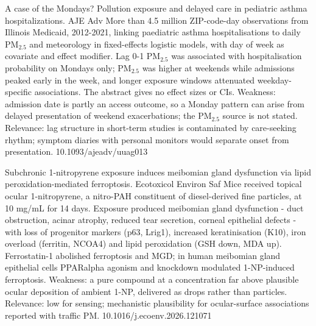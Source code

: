 \documentclass[10pt]{article}
\begin{document}
{A case of the Mondays? Pollution exposure and delayed care in pediatric asthma hospitalizations.}
{AJE Adv}
{More than 4.5 million ZIP-code-day observations from Illinois Medicaid, 2012-2021, linking paediatric asthma hospitalisations to daily PM$_{2.5}$ and meteorology in fixed-effects logistic models, with day of week as covariate and effect modifier. Lag 0-1 PM$_{2.5}$ was associated with hospitalisation probability on Mondays only; PM$_{2.5}$ was higher at weekends while admissions peaked early in the week, and longer exposure windows attenuated weekday-specific associations. The abstract gives no effect sizes or CIs. Weakness: admission date is partly an access outcome, so a Monday pattern can arise from delayed presentation of weekend exacerbations; the PM$_{2.5}$ source is not stated. Relevance: lag structure in short-term studies is contaminated by care-seeking rhythm; symptom diaries with personal monitors would separate onset from presentation.}
{10.1093/ajeadv/uuag013}

\par{}\baselineskip{}\baselineskip
{}

{Subchronic 1-nitropyrene exposure induces meibomian gland dysfunction via lipid peroxidation-mediated ferroptosis.}
{Ecotoxicol Environ Saf}
{Mice received topical ocular 1-nitropyrene, a nitro-PAH constituent of diesel-derived fine particles, at 10 mg/mL for 14 days. Exposure produced meibomian gland dysfunction - duct obstruction, acinar atrophy, reduced tear secretion, corneal epithelial defects - with loss of progenitor markers (p63, Lrig1), increased keratinisation (K10), iron overload (ferritin, NCOA4) and lipid peroxidation (GSH down, MDA up). Ferrostatin-1 abolished ferroptosis and MGD; in human meibomian gland epithelial cells PPARalpha agonism and knockdown modulated 1-NP-induced ferroptosis. Weakness: a pure compound at a concentration far above plausible ocular deposition of ambient 1-NP, delivered as drops rather than particles. Relevance: low for sensing; mechanistic plausibility for ocular-surface associations reported with traffic PM.}
{10.1016/j.ecoenv.2026.121071}
\end{document}
